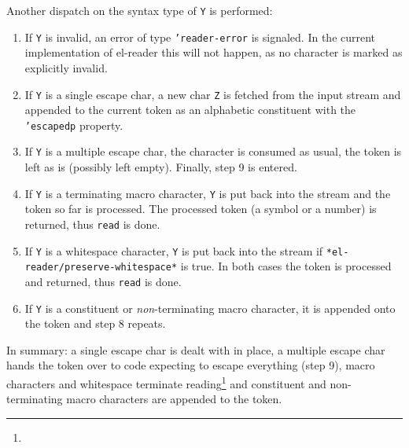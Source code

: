 \documentclass[a4paper,10pt,twoside]{report}
\newcommand{\elr}{el-reader}
\newcommand{\fun}[1]{\texttt{#1}}
\newcommand{\Read}{\fun{read}}
\begin{document}
\begin{enumerate}
  Another dispatch on the syntax type of \texttt{Y} is performed:
  \begin{enumerate}
  \item If \texttt{Y} is invalid, an error of type \texttt{'reader-error} is
    signaled.  In the current implementation of \elr{} this will not happen, as
    no character is marked as explicitly invalid.
  \item If \texttt{Y} is a single escape char, a new char \texttt{Z} is fetched
    from the input stream and appended to the current token as an alphabetic
    constituent with the \texttt{'escapedp} property.
  \item If \texttt{Y} is a multiple escape char, the character is consumed as
    usual, the token is left as is (possibly left empty).  Finally, step 9 is
    entered.
  \item If \texttt{Y} is a terminating macro character, \texttt{Y} is put back
    into the stream and the token so far is processed.  The processed token (a
    symbol or a number) is returned, thus \Read{} is done.
  \item If \texttt{Y} is a whitespace character, \texttt{Y} is put back into the
    stream if \texttt{*el-reader/preserve-whitespace*} is true.  In both cases
    the token is processed and returned, thus \Read{} is done.
  \item If \texttt{Y} is a constituent or \emph{non}-terminating macro
    character, it is appended onto the token and step 8 repeats.
  \end{enumerate}

  In summary: a single escape char is dealt with in place, a multiple escape
  char hands the token over to code expecting to escape everything (step 9),
  macro characters and whitespace terminate reading\footnote{} and constituent
  and non-terminating macro characters are appended to the token.


\end{enumerate}
\end{document}
